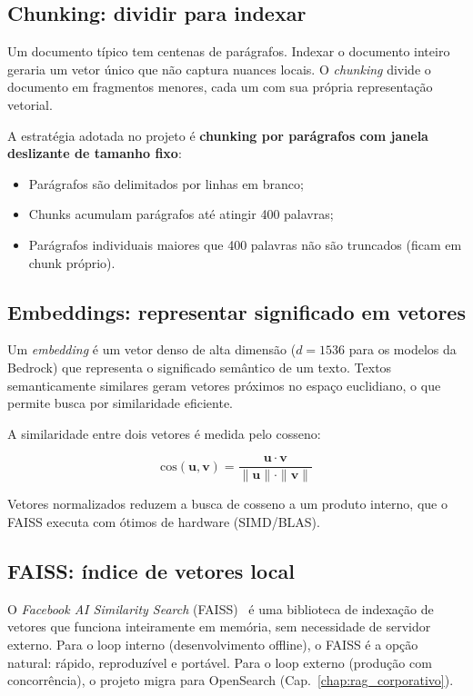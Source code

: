 \subsection{Chunking: dividir para indexar}

Um documento t\'ipico tem centenas de par\'agrafos. Indexar o
documento inteiro geraria um vetor \'unico que n\~ao captura
nuances locais. O \textit{chunking} divide
o documento em fragmentos menores, cada um com sua pr\'opria
representa\c{c}\~ao vetorial.

A estrat\'egia adotada no projeto \'e \textbf{chunking por
par\'agrafos com janela deslizante de tamanho fixo}:

\begin{itemize}[leftmargin=*]
  \item Par\'agrafos s\~ao delimitados por linhas em branco;
  \item Chunks acumulam par\'agrafos at\'e atingir 400 palavras;
  \item Par\'agrafos individuais maiores que 400 palavras n\~ao
        s\~ao truncados (ficam em chunk pr\'oprio).
\end{itemize}

\subsection{Embeddings: representar significado em vetores}

Um \textit{embedding} \'e um vetor
denso de alta dimens\~ao ($d = 1536$ para os modelos da Bedrock)
que representa o significado sem\^antico de um texto. Textos
semanticamente similares geram vetores pr\'oximos no espa\c{c}o
euclidiano, o que permite busca por similaridade eficiente.

A similaridade entre dois vetores \'e medida pelo cosseno:

$$\text{cos}(\mathbf{u}, \mathbf{v}) = \frac{\mathbf{u} \cdot \mathbf{v}}{\|\mathbf{u}\| \cdot \|\mathbf{v}\|}$$

Vetores normalizados reduzem a busca de cosseno a um produto
interno, que o FAISS executa com \'otimos
de hardware (SIMD/BLAS).

\subsection{FAISS: \'indice de vetores local}

O \textit{Facebook AI Similarity Search}
(FAISS)~\cite{faiss2017} \'e uma biblioteca de indexa\c{c}\~ao
de vetores que funciona inteiramente em mem\'oria, sem
necessidade de servidor externo. Para o loop interno
(desenvolvimento offline), o FAISS \'e a op\c{c}\~ao natural:
r\'apido, reproduz\'ivel e portável. Para o loop externo (produ\c{c}\~ao
com concorr\^encia), o projeto migra para OpenSearch
(Cap.~\ref{chap:rag_corporativo}).

